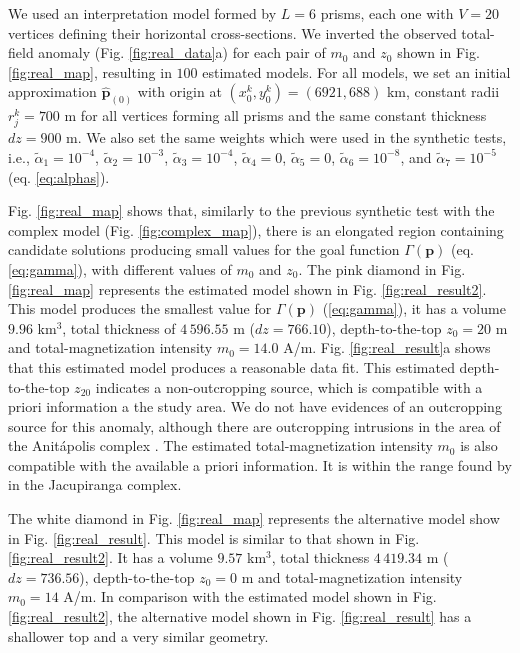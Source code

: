 We used an interpretation model formed by $L = 6$ prisms, each one with 
$V = 20$ vertices defining their horizontal cross-sections.
We inverted the observed total-field anomaly (Fig. \ref{fig:real_data}a) for each 
pair of $m_0$ and $z_0$ shown in Fig. \ref{fig:real_map}, resulting in $100$ estimated 
models. 
For all models, we set an initial approximation $\hat{\mathbf{p}}_{(0)}$ with origin 
at $(x_0^k, y_0^k) = (6921, 688)$ km, constant radii $r_j^k = 700$ m for 
all vertices forming all prisms and the same constant thickness $dz = 900$ m.
We also set the same weights which were used in the synthetic tests, i.e., $\tilde{\alpha}_1 = 10^{-4}$, 
$\tilde{\alpha}_2 = 10^{-3}$, 
$\tilde{\alpha}_3 = 10^{-4}$, $\tilde{\alpha}_4 = 0$, $\tilde{\alpha}_5 = 0$, 
$\tilde{\alpha}_6 = 10^{-8}$, and $\tilde{\alpha}_7 = 10^{-5}$ (eq. \ref{eq:alphas}). 

Fig. \ref{fig:real_map} shows that, similarly to the previous synthetic test with the 
complex model (Fig. \ref{fig:complex_map}), there is an elongated region containing 
candidate solutions producing small values for the goal function 
$\Gamma(\mathbf{p})$ (eq. \ref{eq:gamma}), with different values of $m_0$ and $z_0$.
The pink diamond in Fig. \ref{fig:real_map} represents the estimated model 
shown in Fig. \ref{fig:real_result2}. 
This model produces the smallest value for $ \Gamma(\mathbf{p}) $ (\ref{eq:gamma}),
it has a volume $ 9.96 $ km$ ^3 $, total thickness of $ 4\,596.55 $ m 
($ dz = 766.10 $), depth-to-the-top $z_0 = 20$ m and total-magnetization intensity 
$m_0 = 14.0$ A/m.
Fig. \ref{fig:real_result}a shows that this estimated model produces a reasonable data fit.
This estimated depth-to-the-top $z_20$ indicates a non-outcropping source, 
which is compatible with a priori information a the study area. 
We do not have evidences of an outcropping source for this anomaly, 
although there are outcropping intrusions in the area of the Anit{\'a}polis 
complex \cite[]{gibson-1999}.
The estimated total-magnetization intensity $ m_0 $ is also compatible with the 
available a priori information. It is within the range found by 
\citet{valdivia-2009} in the Jacupiranga complex.

The white diamond in Fig. \ref{fig:real_map} represents the alternative model 
show in Fig. \ref{fig:real_result}. This model is similar to that shown in 
Fig. \ref{fig:real_result2}. It has a volume $ 9.57 $ km$ ^3 $, total thickness 
$ 4\,419.34 $ m ($ dz = 736.56 $), depth-to-the-top $z_0 = 0$ m and 
total-magnetization intensity $m_0 = 14$ A/m. 
In comparison with the estimated model shown in Fig. \ref{fig:real_result2}, the alternative model 
shown in Fig. \ref{fig:real_result} has a shallower top and a very similar geometry.


